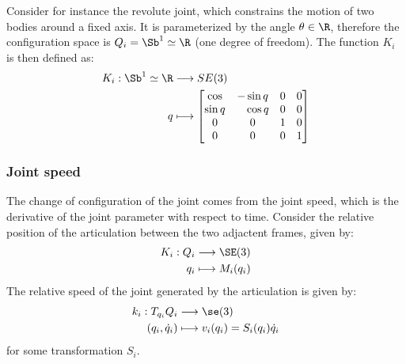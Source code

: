 Consider for instance the revolute joint, which constrains the motion of two bodies around a fixed axis. It is parameterized by the angle $\theta\in\R$, therefore the configuration space is $Q_i=\Sb^1\simeq\R$ (one degree of freedom). The function $K_i$ is then defined as:
\begin{equation*}
    \begin{aligned}
        K_i: \Sb^1\simeq\R &\longrightarrow SE(3)\\
        q &\longmapsto \begin{bmatrix}
            \cos  & -\sin q & 0 & 0\\
            \sin q & \phantom{-}\cos q & 0 & 0\\
            0 & 0 & 1 & 0\\
            0 & 0 & 0 & 1
        \end{bmatrix}
    \end{aligned}
\end{equation*}

\subsubsection{Joint speed}
The change of configuration of the joint comes from the joint speed, which is the derivative of the joint parameter with respect to time. Consider the relative position of the articulation between the two adjactent frames, given by:
\begin{equation*}
    \begin{aligned}
        K_i : Q_i &\longrightarrow \SE(3)\\
        q_i &\longmapsto M_i(q_i)
    \end{aligned}
\end{equation*}
The relative speed of the joint generated by the articulation is given by:
\begin{equation*}
    \begin{aligned}
        k_i:T_{q_i}Q_i &\longrightarrow \se(3)\\
        (q_i, \dot{q}_i) &\longmapsto v_i(q_i) = S_i(q_i)\dot{q}_i
    \end{aligned}
\end{equation*}
for some transformation $S_i$.

